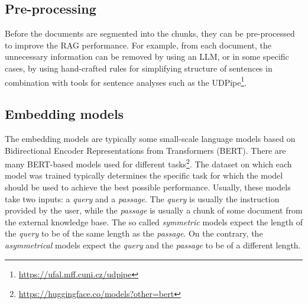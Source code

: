 \subsection{Pre-processing}

Before the documents are segmented into the chunks, they can be pre-processed to improve the RAG performance. For example, from each document, the unnecessary information can be removed by using an LLM, or in some specific cases, by using hand-crafted rules for simplifying structure of sentences in combination with tools for sentence analyses such as the UDPipe\footnote{\url{https://ufal.mff.cuni.cz/udpipe}}.


\subsection{Embedding models}

The embedding models are typically some small-scale language models based on Bidirectional Encoder Representations from Transformers (BERT). There are many BERT-based models used for different tasks\footnote{\url{https://huggingface.co/models?other=bert}}. The dataset on which each model was trained typically determines the specific task for which the model should be used to achieve the best possible performance. Usually, these models take two inputs: a \textit{query} and a \textit{passage}. The \textit{query} is usually the instruction provided by the user, while the \textit{passage} is usually a chunk of some document from the external knowledge base. The so called \textit{symmetric} models expect the length of the \textit{query} to be of the same length as the \textit{passage}. On the contrary, the \textit{asymmetrical} models expect the \textit{query} and the \textit{passage} to be of a different length.